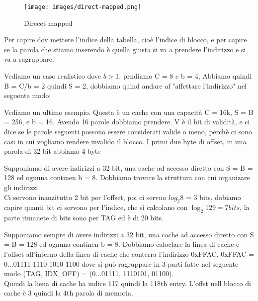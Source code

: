 \begin{wrapfigure}{r}{6.5cm}
    \centering
    \texttt{[image: images/direct-mapped.png]}
    \caption{Direcet mapped}
\end{wrapfigure}

Per capire dov mettere l'indice della tabella, cioè l'indice di blocco, e per capire se la parola che stiamo inserendo è quella giusta si va a prendere l'indirizzo e si va a
ragruppare.


Vediamo un caso realistico dove \(b > 1\), prndiamo C = 8 e b = 4, Abbiamo quindi B = C/b = 2 quindi S = 2, dobbiamo quind andare af "affettare l'indirizzo" nel seguente modo:

Vediamo un ultimo esempio. Questa è un cache  con una capacità C = 16k, S = B = 256, e b = 16. Avendo 16 parole dobbiamo prendere. V è il bit di validità, e ci dice se le parole seguenti
possono essere considerati valide o meno, perchè ci sono casi in cui vogliamo rendere invalido il blocco. I primi due byte di offset, in una parola di 32 bit abbiamo 4 byte 

\begin{example}
    Supponiamo di avere indirizzi a 32 bit, una cache ad accesso diretto con S = B = 128 ed ognuna continen b = 8. Dobbiamo trovare la struttura con cui organizare gli indirizzi.\\
    Ci servono inanzitutto 2 bit per l'offset, poi ci servno \(log_2 8\) = 3 bits, dobiamo capire quanti bit ci servono per l'indice, che si calcolano con \(\log_2 129 = 7 bits\), la parte rimanete
    di bits sono per TAG ed è di 20 bits.
\end{example}

\begin{example}
    Supponiamo sempre di avere indirizzi a 32 bit, una cache ad accesso diretto con S = B = 128 ed ognuna continen b = 8. Dobbiamo caloclare la linea di cache e l'offset all'interno della linea
    di cache che conterra l'indirizzo 0xFFAC. 0xFFAC = 0...01111 1110 1010 1100 dove si può ragruppare in 3 parti fatte nel seguente modo (TAG, IDX, OFF) = (0...01111, 1110101, 01100). \\
    Quindi la liena di cache ha indice 117 quindi la 118th entry. L'offst nell blocco di cache è 3 quindi la 4th parola di memoria.
\end{example}

